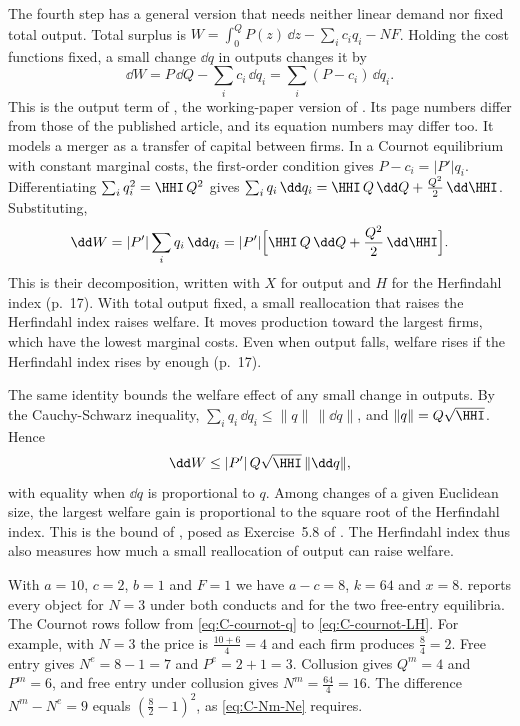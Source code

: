 The fourth step has a general version that needs neither linear demand nor fixed total output. Total surplus is
$W = \int_0^QP(z)\,\dd z - \sum_ic_iq_i - NF$. Holding the cost functions fixed, a small change $\dd q$ in outputs
changes it by
\begin{equation*}
\dd W = P\,\dd Q - \sum_ic_i\,\dd q_i = \sum_i(P - c_i)\,\dd q_i .
\end{equation*}
This is the output term of \citet[eq.~3, p.~7]{FarrellShapiro1988}, the working-paper version of
\citet{FarrellShapiro1990}. Its page numbers differ from those of the published article, and its equation numbers may
differ too. It models a merger as a transfer of capital between firms. In a Cournot equilibrium with constant marginal costs, the first-order
condition gives $P - c_i = \lvert P'\rvert q_i$. Differentiating $\sum_iq_i^2 = \HHI\,Q^2$ gives
$\sum_iq_i\,\dd q_i = \HHI\,Q\,\dd Q + \frac{Q^2}{2}\,\dd\HHI$. Substituting,
\begin{equation}\label{eq:C-fs-welfare}
\dd W = \lvert P'\rvert\sum_iq_i\,\dd q_i = \lvert P'\rvert\Big[\HHI\,Q\,\dd Q + \frac{Q^2}{2}\,\dd\HHI\Big] .
\end{equation}
This is their decomposition, written with $X$ for output and $H$ for the Herfindahl index (p.~17). With total output
fixed, a small reallocation that raises the Herfindahl index raises welfare. It moves production toward the largest
firms, which have the lowest marginal costs. Even when output falls, welfare rises if the Herfindahl index rises by
enough (p.~17).

The same identity bounds the welfare effect of any small change in outputs. By the Cauchy-Schwarz inequality,
$\sum_iq_i\,\dd q_i \le \lVert q\rVert\,\lVert\dd q\rVert$, and $\lVert q\rVert = Q\sqrt{\HHI}$. Hence
\begin{equation*}
\dd W \le \lvert P'\rvert\,Q\sqrt{\HHI}\,\lVert\dd q\rVert ,
\end{equation*}
with equality when $\dd q$ is proportional to $q$. Among changes of a given Euclidean size, the largest welfare gain is
proportional to the square root of the Herfindahl index. This is the bound of \citet{DansbyWillig1979}, posed as
Exercise~5.8 of \citet[Section~5.5]{Tirole1988}. The Herfindahl index thus also measures how much a small reallocation
of output can raise welfare.

With $a = 10$, $c = 2$, $b = 1$ and $F = 1$ we have $a - c = 8$, $k = 64$ and $x = 8$.
 reports every object for $N = 3$ under both conducts and for the two free-entry
equilibria. The Cournot rows follow from \eqref{eq:C-cournot-q} to \eqref{eq:C-cournot-LH}. For example, with
$N = 3$ the price is $\frac{10 + 6}{4} = 4$ and each firm produces $\frac{8}{4} = 2$. Free entry gives
$N^e = 8 - 1 = 7$ and $P^e = 2 + 1 = 3$. Collusion gives $Q^m = 4$ and $P^m = 6$, and free entry under collusion
gives $N^m = \frac{64}{4} = 16$. The difference $N^m - N^e = 9$ equals $(\frac{8}{2} - 1)^2$, as
\eqref{eq:C-Nm-Ne} requires.

